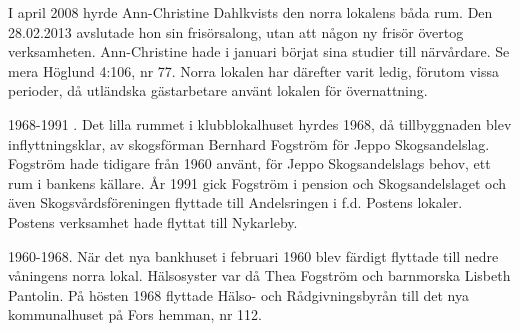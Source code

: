 I april 2008 hyrde Ann-Christine Dahlkvists  den norra lokalens båda rum. Den 28.02.2013 avslutade hon sin frisörsalong, utan att någon ny frisör övertog verksamheten. Ann-Christine hade i januari börjat sina studier till närvårdare. Se mera Höglund 4:106, nr 77. Norra lokalen har därefter varit ledig, förutom vissa perioder, då utländska gästarbetare använt lokalen för övernattning.

1968-1991
. Det lilla rummet i klubblokalhuset hyrdes 1968, då tillbyggnaden blev inflyttningsklar, av skogsförman Bernhard Fogström för Jeppo Skogsandelslag. Fogström hade tidigare från 1960 använt, för Jeppo Skogsandelslags behov, ett rum i bankens källare. År 1991 gick Fogström i pension och Skogsandelslaget och även Skogsvårdsföreningen flyttade till Andelsringen i f.d. Postens lokaler. Postens verksamhet hade flyttat till Nykarleby.

1960-1968.
När det nya bankhuset i februari 1960 blev färdigt flyttade  till nedre våningens norra lokal. Hälsosyster var då Thea Fogström och barnmorska Lisbeth Pantolin. På hösten 1968 flyttade Hälso- och Rådgivningsbyrån till det nya	kommunalhuset på Fors hemman, nr 112.




